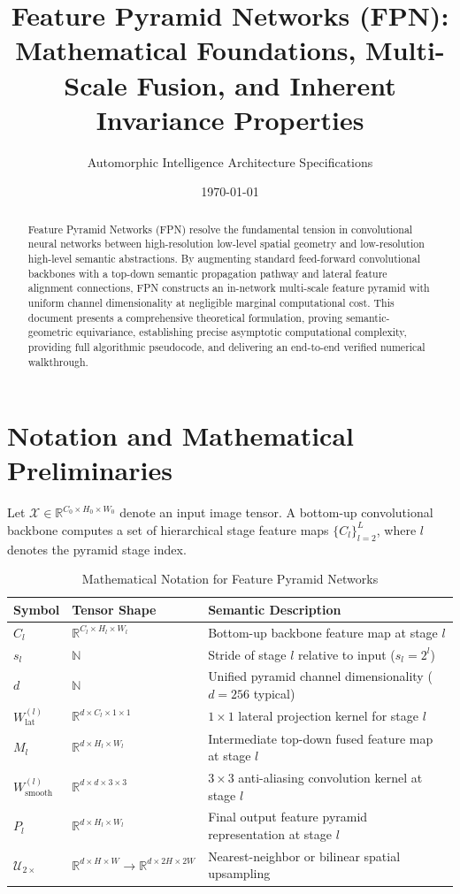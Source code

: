 \documentclass[11pt,a4paper]{article}
\title{Feature Pyramid Networks (FPN): Mathematical Foundations, Multi-Scale Fusion, and Inherent Invariance Properties}
\author{Automorphic Intelligence Architecture Specifications}
\date{\today}
\theoremstyle{definition}
\begin{document}
\maketitle

\begin{abstract}
Feature Pyramid Networks (FPN) resolve the fundamental tension in convolutional neural networks between high-resolution low-level spatial geometry and low-resolution high-level semantic abstractions. By augmenting standard feed-forward convolutional backbones with a top-down semantic propagation pathway and lateral feature alignment connections, FPN constructs an in-network multi-scale feature pyramid with uniform channel dimensionality at negligible marginal computational cost. This document presents a comprehensive theoretical formulation, proving semantic-geometric equivariance, establishing precise asymptotic computational complexity, providing full algorithmic pseudocode, and delivering an end-to-end verified numerical walkthrough.
\end{abstract}

\section{Notation and Mathematical Preliminaries}

Let $\mathcal{X} \in \mathbb{R}^{C_0 \times H_0 \times W_0}$ denote an input image tensor. A bottom-up convolutional backbone computes a set of hierarchical stage feature maps $\{C_l\}_{l=2}^L$, where $l$ denotes the pyramid stage index.

\begin{table}[h]
\centering
\caption{Mathematical Notation for Feature Pyramid Networks}
\begin{tabular}{lll}
\toprule
\textbf{Symbol} & \textbf{Tensor Shape} & \textbf{Semantic Description} \\
\midrule
$C_l$ & $\mathbb{R}^{C_l \times H_l \times W_l}$ & Bottom-up backbone feature map at stage $l$ \\
$s_l$ & $\mathbb{N}$ & Stride of stage $l$ relative to input ($s_l = 2^l$) \\
$d$ & $\mathbb{N}$ & Unified pyramid channel dimensionality ($d = 256$ typical) \\
$W_{\text{lat}}^{(l)}$ & $\mathbb{R}^{d \times C_l \times 1 \times 1}$ & $1 \times 1$ lateral projection kernel for stage $l$ \\
$M_l$ & $\mathbb{R}^{d \times H_l \times W_l}$ & Intermediate top-down fused feature map at stage $l$ \\
$W_{\text{smooth}}^{(l)}$ & $\mathbb{R}^{d \times d \times 3 \times 3}$ & $3 \times 3$ anti-aliasing convolution kernel at stage $l$ \\
$P_l$ & $\mathbb{R}^{d \times H_l \times W_l}$ & Final output feature pyramid representation at stage $l$ \\
$\mathcal{U}_{2\times}$ & $\mathbb{R}^{d \times H \times W} \to \mathbb{R}^{d \times 2H \times 2W}$ & Nearest-neighbor or bilinear spatial upsampling \\
\bottomrule
\end{tabular}
\end{table}
\end{document}
